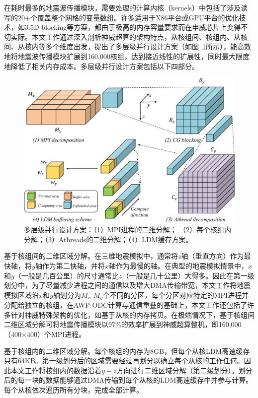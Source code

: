 \documentclass[degree=doctor]{thuthesis}
\begin{document}
在耗时最多的地震波传播模块，需要处理的计算内核（kernels）中包括了涉及读写的20+个覆盖整个网格的变量数组。许多适用于X86平台或GPU平台的优化技术，如3.5D blocking等方案\citep {nguyen20103}，都由于极高的内存容量要求而在申威芯片上变得不切实际。本文工作通过深入剖析神威超算的架构特点，从核组间、核组内、从核间、从核内等多个维度出发，提出了多层级并行设计方案（如图~\ref{fig:dd}所示），能高效地将地震波传播模块扩展到160,000核组，达到接近线性的扩展性，同时最大限度地降低了相关内存成本。多层级并行设计方案包括以下四部分。

\begin{figure}[ht]
\centering
\includegraphics[width=0.9\columnwidth]{blocking.pdf}
\caption{多层级并行设计方案：（1）MPI进程的二维分解； （2）每个核组内分解；（3）Athreads的二维分解；（4）LDM缓存方案。}
\label{fig:dd}
\end{figure}

基于核组间的二维区域分解。在三维地震模拟中，通常将$ z $轴（垂直方向）作为最快轴，将$ y $轴作为第二快轴，并将$ x $轴作为最慢的轴。在典型的地震模拟情景中，$ x $和$ y $（一般是几百公里）的尺寸通常比$ z $（一般是几十公里）大得多。因此在第一级划分中，为了尽量减少进程之间的通信以及增大DMA传输带宽，本文工作将地震模拟区域沿$x$和$y$轴划分为$ M_x $ $ M_y $个不同的分区，每个分区对应特定的MPI进程并分配给独立的核组，在AWP-ODC\citep{cui2010scalable}计算与通信重叠的基础上，本文工作还包括了许多针对神威特殊架构的优化，如基于从核的内存拷贝。在极端情况下，基于核组间二维区域分解可将地震传播模块以97\%的效率扩展到神威超算整机，即160,000（400×400）个MPI进程。

基于核组内的二维区域分解。每个核组的内存为8GB，但每个从核LDM高速缓存只有64KB。第一级划分后的区域需要经过再划分以确立每个从核的工作任何。因此本文工作将核组内的数据沿着$ y-z $方向进行二维区域分解（第二级划分）。划分后的每一块的数据能够通过DMA传输到每个从核的LDM高速缓存中并参与计算。每个从核依次遍历所有分块，完成全部计算。
\end{document}
